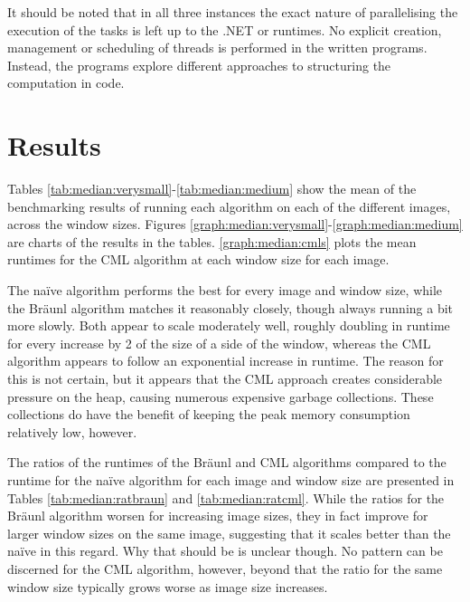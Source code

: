 It should be noted that in all three instances the exact nature of parallelising the execution of the tasks is left up to the .NET or \hopac{} runtimes.  No explicit creation, management or scheduling of threads is performed in the written programs.  Instead, the programs explore different approaches to structuring the computation in code.

\section{Results}
Tables \ref{tab:median:verysmall}-\ref{tab:median:medium} show the mean of the benchmarking results of running each algorithm on each of the different images, across the window sizes.  Figures \ref{graph:median:verysmall}-\ref{graph:median:medium} are charts of the results in the tables.  \autoref{graph:median:cmls} plots the mean runtimes for the CML algorithm at each window size for each image. 

The na\"{i}ve algorithm performs the best for every image and window size, while the Bräunl algorithm matches it reasonably closely, though always running a bit more slowly.  Both appear to scale moderately well, roughly doubling in runtime for every increase by 2 of the size of a side of the window, whereas the CML algorithm appears to follow an exponential increase in runtime.  The reason for this is not certain, but it appears that the CML approach creates considerable pressure on the heap, causing numerous expensive garbage collections.  These collections do have the benefit of keeping the peak memory consumption relatively low, however.  %

The ratios of the runtimes of the Bräunl and CML algorithms compared to the runtime for the naïve algorithm for each image and window size are presented in Tables \ref{tab:median:ratbraun} and \ref{tab:median:ratcml}.  While the ratios for the Bräunl algorithm worsen for increasing image sizes, they in fact improve for larger window sizes on the same image, suggesting that it scales better than the naïve in this regard.  Why that should be is unclear though.  No pattern can be discerned for the CML algorithm, however, beyond that the ratio for the same window size typically grows worse as image size increases.

